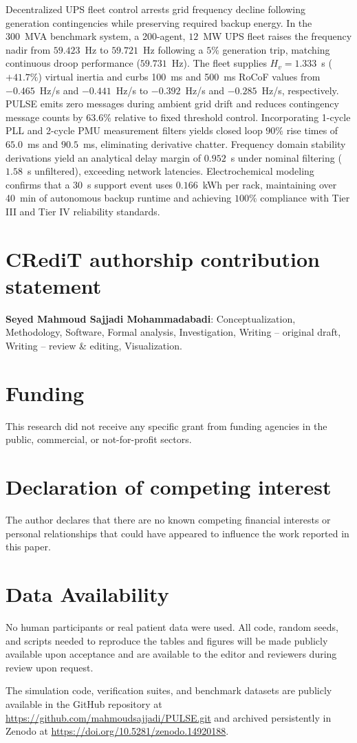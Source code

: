 \documentclass[preprint,12pt]{elsarticle}
\begin{document}
Decentralized UPS fleet control arrests grid frequency decline following generation contingencies while preserving required backup energy. In the 300~MVA benchmark system, a 200-agent, $12$~MW UPS fleet raises the frequency nadir from $59.423$~Hz to $59.721$~Hz following a $5\%$ generation trip, matching continuous droop performance ($59.731$~Hz). The fleet supplies $H_v = 1.333$~s ($+41.7\%$) virtual inertia and curbs 100~ms and 500~ms RoCoF values from $-0.465$~Hz/s and $-0.441$~Hz/s to $-0.392$~Hz/s and $-0.285$~Hz/s, respectively. PULSE emits zero messages during ambient grid drift and reduces contingency message counts by $63.6\%$ relative to fixed threshold control. Incorporating 1-cycle PLL and 2-cycle PMU measurement filters yields closed loop $90\%$ rise times of $65.0$~ms and $90.5$~ms, eliminating derivative chatter. Frequency domain stability derivations yield an analytical delay margin of $0.952$~s under nominal filtering ($1.58$~s unfiltered), exceeding network latencies. Electrochemical modeling confirms that a 30~s support event uses $0.166$~kWh per rack, maintaining over 40~min of autonomous backup runtime and achieving $100\%$ compliance with Tier III and Tier IV reliability standards.

\section*{CRediT authorship contribution statement}
{\sloppy \textbf{Seyed Mahmoud Sajjadi Mohammadabadi}: Conceptualization, Methodology, Software, Formal analysis, Investigation, Writing -- original draft, Writing -- review \& editing, Visualization.\par}

\section*{Funding}
This research did not receive any specific grant from funding agencies in the public, commercial, or not-for-profit sectors.

\section*{Declaration of competing interest}
The author declares that there are no known competing financial interests or personal relationships that could have appeared to influence the work reported in this paper.

\section*{Data Availability}
No human participants or real patient data were used. All code, random seeds, and scripts needed to reproduce the tables and figures will be made publicly available upon acceptance and are available to the editor and reviewers during review upon request.
{\sloppy The simulation code, verification suites, and benchmark datasets are publicly available in the GitHub repository at \url{https://github.com/mahmoudsajjadi/PULSE.git} and archived persistently in Zenodo \cite{pulsedataset2026} at \url{https://doi.org/10.5281/zenodo.14920188}.\par}
\end{document}
